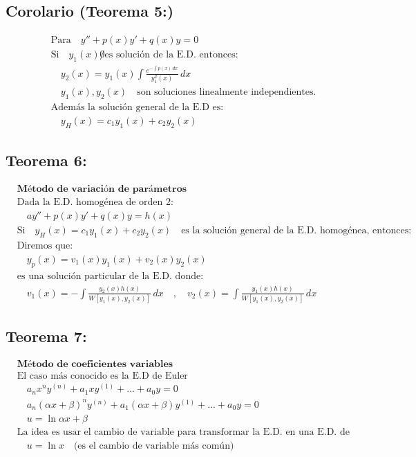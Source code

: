 \documentclass[a4paper,12pt,numbers=noenddot]{scrreprt}
\begin{document}
\subsection*{Corolario (Teorema 5:)}
\begin{align*}
    &\text{Para} \quad y'' + p(x)y' + q(x)y = 0 \\
    &\text{Si} \quad y_1(x) \not 0 \text{es solución de la E.D. entonces:}\\
    &\quad y_2(x) = y_1(x) \int \frac{e^{-\int p(x)\,dx}}{y_1^2(x)} \,dx\\
    &\quad {y_1(x), y_2(x)} \quad \text{son soluciones linealmente independientes.}\\
    &\text{Además la solución general de la E.D es:}\\
    &\quad y_H(x) = c_1y_1(x) + c_2y_2(x)
\end{align*}

\subsection*{Teorema 6:}
\begin{align*}
    &\textbf{Método de variación de parámetros}\\
    &\text{Dada la E.D. homogénea de orden 2:}\\
    &\quad a y'' + p(x) y' + q(x) y = h(x)\\
    &\text{Si} \quad y_H(x) = c_1y_1(x) + c_2y_2(x) \quad \text{es la solución general de la E.D. homogénea, entonces:}\\
    &\text{Diremos que:}\\
    &\quad y_p(x) = v_1(x)y_1(x) + v_2(x)y_2(x)\\
    &\text{es una solución particular de la E.D. donde:}\\
    &\quad v_1(x) = -\int \frac{y_2(x)h(x)}{W[y_1(x),y_2(x)]} \,dx \quad , \quad v_2(x) = \int \frac{y_1(x)h(x)}{W[y_1(x),y_2(x)]} \,dx
\end{align*}

\subsection*{Teorema 7:}
\begin{align*}
    &\textbf{Método de coeficientes variables}\\
    &\text{El caso más conocido es la E.D de Euler}\\
    &\quad a_n x^n y^(n) + a_{1} x y^(1) + ... + a_0 y = 0\\
    &\quad a_n(\alpha x + \beta)^n y^(n) + a_{1}(\alpha x + \beta) y^(1) + ... + a_0 y = 0\\
    &\quad u = \ln{\alpha x + \beta}\\
    &\text{La idea es usar el cambio de variable para transformar la E.D. en una E.D. de coeficientes constantes.}\\
    &\quad u= \ln x \quad \text{(es el cambio de variable más común)}
\end{align*} 
\end{document}
